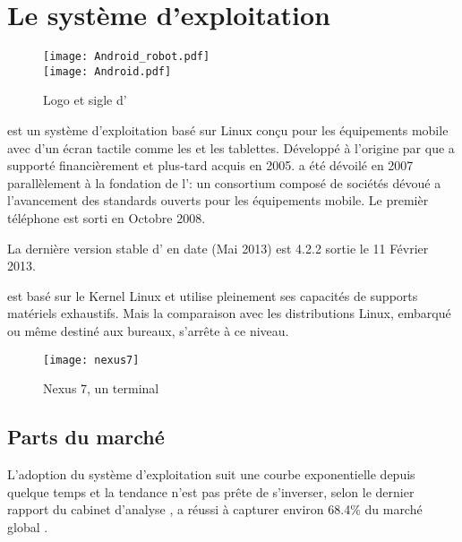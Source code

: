 \section{Le système d'exploitation \android{}}

\begin{figure}[H]
\begin{center}
\texttt{[image: Android\_robot.pdf]}\\
\texttt{[image: Android.pdf]}
\end{center}
\caption{Logo et sigle d'\android{}}
\end{figure}

\android{} est un système d'exploitation basé sur Linux conçu pour les
équipements mobile avec d'un écran tactile comme les  et
les tablettes. Développé à l'origine par  que
 a supporté financièrement et plus-tard acquis en 2005.
\android{} a été dévoilé en 2007 parallèlement à la fondation de
l': un consortium composé de sociétés dévoué a
l'avancement des standards ouverts pour les équipements mobile. Le
premièr téléphone  \android{} est sorti en Octobre 2008.

La dernière version stable d'\android{} en date (Mai 2013) est 4.2.2
 sortie le 11 Février 2013.

\android{} est basé sur le Kernel Linux et utilise pleinement ses capacités de supports matériels exhaustifs. Mais la comparaison avec les distributions Linux, embarqué ou même destiné aux bureaux, s'arrête à ce niveau.~\cite{lft:growth_android}

\begin{figure}
\centering
\texttt{[image: nexus7]}
\caption{ Nexus 7, un terminal \android}
\end{figure}

\subsection{Parts du marché}

L’adoption du système d'exploitation \android{} suit une courbe
exponentielle depuis quelque temps et la tendance n'est pas prête de
s’inverser, selon le dernier rapport du cabinet d'analyse , \android{} a réussi à capturer environ 68.4\% du marché
global \cite{venturebeat.com}.

